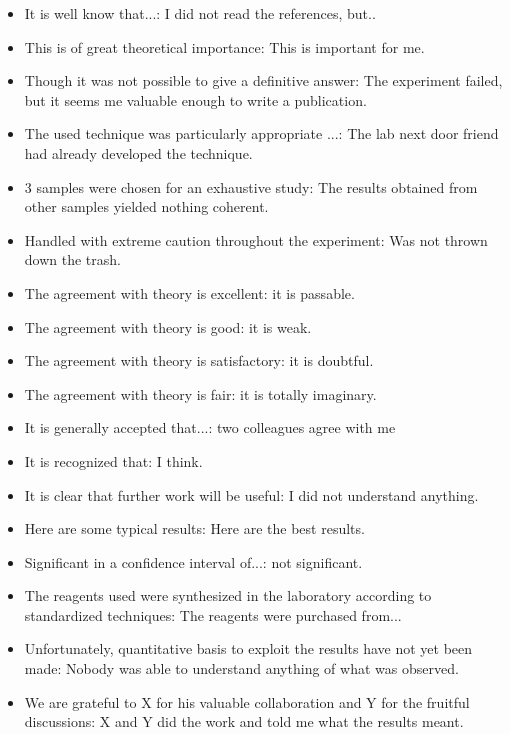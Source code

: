 \begin{itemize}
	\item It is well know that...: I did not read the references, but..

	\item This is of great theoretical importance: This is important for me.

	\item Though it was not possible to give a definitive answer: The experiment failed, but it seems me valuable enough to write a publication.

	\item The used technique was particularly appropriate ...: The lab next door friend had already developed the technique.

	\item 3 samples were chosen for an exhaustive study: The results obtained from other samples yielded nothing coherent.

	\item Handled with extreme caution throughout the experiment: Was not thrown down the trash.

	\item The agreement with theory is excellent: it is passable.

	\item The agreement with theory is good: it is weak.

	\item The agreement with theory is satisfactory: it is doubtful.

	\item The agreement with theory is fair: it is totally imaginary.

	\item It is generally accepted that...: two colleagues agree with me

	\item It is recognized that: I think.

	\item It is clear that further work will be useful: I did not understand anything.

	\item Here are some typical results: Here are the best results.

	\item Significant in a confidence interval of...: not significant.

	\item The reagents used were synthesized in the laboratory according to standardized techniques: The reagents were purchased from...

	\item Unfortunately, quantitative basis to exploit the results have not yet been made: Nobody was able to understand anything of what was observed.

	\item We are grateful to X for his valuable collaboration and Y for the fruitful discussions: X and Y did the work and told me what the results meant.
\end{itemize}


